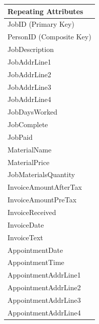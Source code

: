\begin{flushleft}
\begin{longtable}{|p{12cm}|}
			\textbf{Repeating Attributes} \\ \hline
			JobID (Primary Key) \\
			PersonID (Composite Key) \\
          JobDescription \\
			JobAddrLine1 \\
			JobAddrLine2 \\
			JobAddrLine3 \\
			JobAddrLine4 \\
			JobDaysWorked \\
			JobComplete \\
			JobPaid \\
			MaterialName \\
			MaterialPrice \\
			JobMaterialsQuantity \\
			InvoiceAmountAfterTax \\
			InvoiceAmountPreTax \\
			InvoiceReceived \\
			InvoiceDate \\
			InvoiceText \\
			AppointmentDate \\
			AppointmentTime \\
			AppointmentAddrLine1 \\
			AppointmentAddrLine2 \\
			AppointmentAddrLine3	\\
			AppointmentAddrLine4 \\ \hline
			
    \end{longtable}
\end{flushleft}

